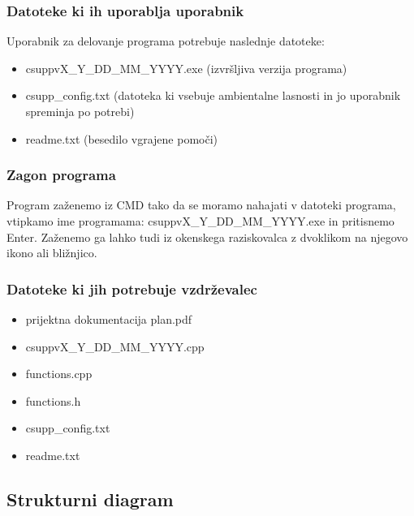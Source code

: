 \documentclass[a4paper,12pt]{article}
\begin{document}
			\subsubsection{Datoteke ki ih uporablja uporabnik}

			\qquad Uporabnik za delovanje programa potrebuje naslednje datoteke:

			\begin{itemize}

				\item csuppvX\_Y\_DD\_MM\_YYYY.exe (izvršljiva verzija programa)

				\item csupp\_config.txt (datoteka ki vsebuje ambientalne lasnosti in jo uporabnik spreminja po potrebi)

				\item readme.txt (besedilo vgrajene pomoči)

			\end{itemize}

			\subsubsection{Zagon programa}

			\qquad Program  zaženemo iz CMD tako da se moramo nahajati v datoteki programa, vtipkamo ime programama: 
			csuppvX\_Y\_DD\_MM\_YYYY.exe in pritisnemo Enter. Zaženemo  ga  lahko  tudi  iz  okenskega raziskovalca 
			z dvoklikom na njegovo ikono ali bližnjico. 

			\subsubsection{Datoteke ki jih potrebuje vzdrževalec}

			\begin{itemize}

				\item prijektna dokumentacija plan.pdf 
				\item csuppvX\_Y\_DD\_MM\_YYYY.cpp 
				\item functions.cpp
				\item functions.h
				\item csupp\_config.txt
				\item readme.txt

			\end{itemize}


		\subsection{Strukturni diagram}
\end{document}

